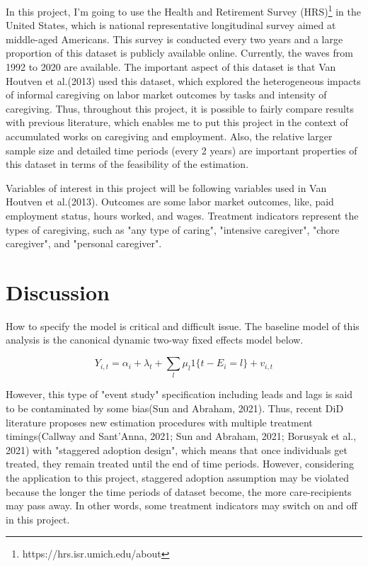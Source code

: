 \documentclass{article}
\theoremstyle{definition}
\begin{document}
In this project, I'm going to use the Health and Retirement Survey (HRS)\footnote[2]{https://hrs.isr.umich.edu/about} in the United States, which is national representative longitudinal survey aimed at middle-aged Americans. This survey is conducted every two years and a large proportion of this dataset is publicly available online. Currently, the waves from 1992 to 2020 are available. The important aspect of this dataset is that Van Houtven et al.(2013) used this dataset, which explored the heterogeneous impacts of informal caregiving on labor market outcomes by tasks and intensity of caregiving. Thus, throughout this project, it is possible to fairly compare results with previous literature, which enables me to put this project in the context of accumulated works on caregiving and employment. Also, the relative larger sample size and detailed time periods (every 2 years) are important properties of this dataset in terms of the feasibility of the estimation.

Variables of interest in this project will be following variables used in Van Houtven et al.(2013). Outcomes are some labor market outcomes, like, paid employment status, hours worked, and wages. Treatment indicators represent the types of caregiving, such as "any type of caring", "intensive caregiver", "chore caregiver", and "personal caregiver".


\section{Discussion}

How to specify the model is critical and difficult issue. The baseline model of this analysis is the canonical dynamic two-way fixed effects model below.

\begin{equation*}
    Y_{i,t} = \alpha_{i} + \lambda_{t} + \sum_{l}\mu_{l}1\{t-E_{i} = l\} + v_{i,t}
\end{equation*}

However, this type of "event study" specification including leads and lags is said to be contaminated by some bias(Sun and Abraham, 2021). Thus, recent DiD literature proposes new estimation procedures with multiple treatment timings(Callway and Sant'Anna, 2021; Sun and Abraham, 2021; Borusyak et al., 2021) with "staggered adoption design", which means that once individuals get treated, they remain treated until the end of time periods. However, considering the application to this project, staggered adoption assumption may be violated because the longer the time periods of dataset become, the more care-recipients may pass away. In other words, some treatment indicators may switch on and off in this project. 
\end{document}
